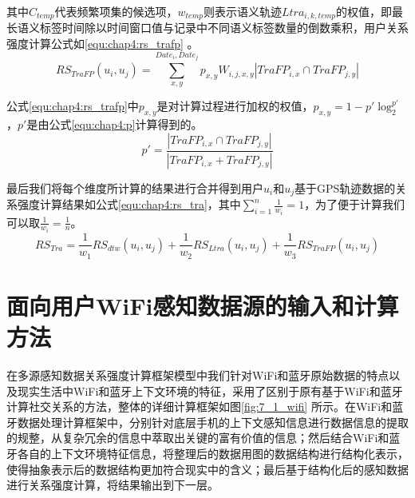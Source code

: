 \par 其中$C_{temp}$代表频繁项集的候选项，$w_{temp}$则表示语义轨迹$Ltra_{i,k,temp}$的权值，即最长语义标签时间除以时间窗口值与记录中不同语义标签数量的倒数乘积，用户关系强度计算公式如\ref{equ:chap4:rs_trafp} 。
\begin{equation}
\label{equ:chap4:rs_trafp}
RS_{TraFP}(u_{i},u_{j})=\sum_{x ,y }^{ Date_{i}, Date_{j}} p_{x,y} W_{i,j,x,y} \left |TraFP_{i,x} \cap TraFP_{j,y}   \right |
\end{equation}
\par 公式\ref{equ:chap4:rs_trafp}中$p_{x,y}$是对计算过程进行加权的权值，$p_{x,y}=1-{p}'\log_{2}^{{p}'}$，${p}'$是由公式\ref{equ:chap4:p}计算得到的。
\begin{equation}
\label{equ:chap4:p}
{p}'=\frac{\left |TraFP_{i,x} \cap TraFP_{j,y}   \right |}{\left |TraFP_{i,x} + TraFP_{j,y}   \right |}
\end{equation}

\par  最后我们将每个维度所计算的结果进行合并得到用户$u_{i}$和$u_{j}$基于GPS轨迹数据的关系强度计算结果如公式\ref{equ:chap4:rs_tra}，其中$ \sum_{i=1}^{n}\frac{1}{w_{i}}=1$，为了便于计算我们可以取$\frac{1}{w_{i}}=\frac{1}{n}$。
\begin{equation}
\label{equ:chap4:rs_tra}
RS_{Tra}=\frac{1}{w_{1}} RS_{dtw}(u_{i},u_{j})+\frac{1}{w_{2}}RS_{Ltra}(u_{i},u_{j})+\frac{1}{w_{3}}RS_{TraFP}(u_{i},u_{j})
\end{equation}
\section{面向用户WiFi感知数据源的输入和计算方法}
\label{sec:wifi_input}
在多源感知数据关系强度计算框架模型中我们针对WiFi和蓝牙原始数据的特点以及现实生活中WiFi和蓝牙上下文环境的特征，采用了区别于原有基于WiFi和蓝牙计算社交关系的方法，整体的详细计算框架如图\ref{fig:7_1_wifi} 所示。在WiFi和蓝牙数据处理计算框架中，分别针对底层手机的上下文感知信息进行数据信息的提取的规整，从复杂冗余的信息中萃取出关键的富有价值的信息；然后结合WiFi和蓝牙各自的上下文环境特征信息，将整理后的数据用图的数据结构进行结构化表示，使得抽象表示后的数据结构更加符合现实中的含义；最后基于结构化后的感知数据进行关系强度计算，将结果输出到下一层。

